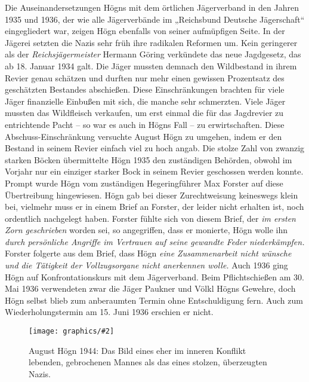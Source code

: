 \documentclass{book}
\newcommand{\img}[2][width=\linewidth]{\noindent\texttt{[image: graphics/\#2]}}
\begin{document}
Die Auseinandersetzungen Högns mit dem örtlichen Jägerverband in den
Jahren 1935 und 1936, der wie alle Jägerverbände im „Reichsbund
Deutsche Jägerschaft“ eingegliedert war, zeigen Högn ebenfalls von
seiner aufmüpfigen Seite. In der Jägerei setzten die Nazis sehr früh
ihre radikalen Reformen um. Kein geringerer als der
\textit{Reichsjägermeister} Hermann Göring verkündete das neue
Jagdgesetz, das ab 18. Januar 1934 galt. Die Jäger mussten demnach den
Wildbestand in ihrem Revier genau schätzen und durften nur mehr einen
gewissen Prozentsatz des geschätzten Bestandes abschießen. Diese
Einschränkungen brachten für viele Jäger finanzielle Einbußen mit sich,
die manche sehr schmerzten. Viele Jäger mussten das Wildfleisch
verkaufen, um erst einmal die für das Jagdrevier zu entrichtende Pacht
– so war es auch in Högns Fall – zu erwirtschaften. Diese
Abschuss-Einschränkung versuchte August Högn zu umgehen, indem er den
Bestand in seinem Revier einfach viel zu hoch angab. Die stolze Zahl
von zwanzig starken Böcken übermittelte Högn 1935 den zuständigen
Behörden, obwohl im Vorjahr nur ein einziger starker Bock in seinem
Revier geschossen werden konnte. Prompt wurde Högn vom zuständigen
Hegeringführer Max Forster auf diese Übertreibung hingewiesen. Högn gab
bei dieser Zurechtweisung keineswegs klein bei, vielmehr muss er in
einem Brief an Forster, der leider nicht erhalten ist, noch ordentlich
nachgelegt haben. Forster fühlte sich von diesem Brief, der
\textit{im ersten Zorn geschrieben} worden sei, so angegriffen, dass er
monierte, Högn wolle ihn \textit{durch persönliche Angriffe im
Vertrauen auf seine gewandte Feder niederkämpfen.} Forster folgerte aus
dem Brief, dass Högn \textit{eine Zusammenarbeit nicht wünsche und die
Tätigkeit der Vollzugsorgane nicht anerkennen wolle.} Auch 1936 ging
Högn auf Konfrontationskurs mit dem Jägerverband. Beim Pflichtschießen
am 30. Mai 1936 verwendeten zwar die Jäger Paukner und Völkl Högns
Gewehre, doch Högn selbst blieb zum anberaumten Termin ohne
Entschuldigung fern. Auch zum Wiederholungstermin am 15. Juni 1936
erschien er nicht.

\begin{figure}
\img{Hoegn-2-Weltkrieg.jpg}
\caption{August Högn 1944: Das Bild eines eher im inneren Konflikt
lebenden, gebrochenen Mannes als das eines stolzen, überzeugten Nazis.}
\end{figure}
\end{document}
